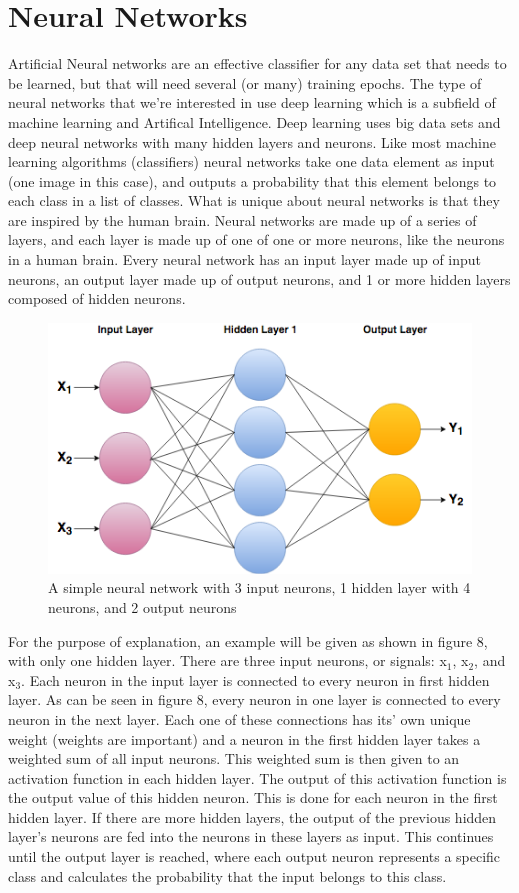 \documentclass[12pt]{report} %
\begin{document}
\chapter{Neural Networks}
	Artificial Neural networks are an effective classifier for any data set that needs to be learned, but that will need several (or many) training epochs. The type of neural networks that we're interested in use deep learning which is a subfield of machine learning and Artifical Intelligence. Deep learning uses big data sets and deep neural networks with many hidden layers and neurons\cite{deepMachineMastry}. Like most machine learning algorithms (classifiers)  neural networks take one data element as input (one image in this case), and outputs a probability that this element belongs to each class in a list of classes. What is unique about neural networks is that they are inspired by the human brain. 
	Neural networks are made up of a series of layers, and each layer is made up of one of one or more neurons, like the neurons in a human brain. Every neural network has an input layer made up of input neurons, an output layer made up of output neurons, and 1 or more hidden layers composed of hidden neurons.

\begin{figure}
\centering
\includegraphics[width=5in]{NeuralNetwork}
\caption{A simple neural network with 3 input neurons, 1 hidden layer with 4 neurons, and 2 output neurons}
\end{figure}
	For the purpose of explanation, an example will be given as shown in figure 8, with only one hidden layer. There are three input neurons, or signals: x$_{1}$, x$_{2}$, and x$_{3}$. Each neuron in the input layer is connected to every neuron in first hidden layer. As can be seen in figure 8, every neuron in one layer is connected to every neuron in the next layer. Each one of these connections has its' own unique weight (weights are important) and a neuron in the first hidden layer takes a weighted sum of all input neurons. This weighted sum is then given to an activation function in each hidden layer. The output of this activation function is the output value of this hidden neuron. This is done for each neuron in the first hidden layer. If there are more hidden layers, the output of the previous hidden layer's neurons are fed into the neurons in these layers as input. This continues until the output layer is reached, where each output neuron represents a specific class and calculates the probability that the input belongs to this class.\cite{KubatMachineLearn}
	
\end{document}
